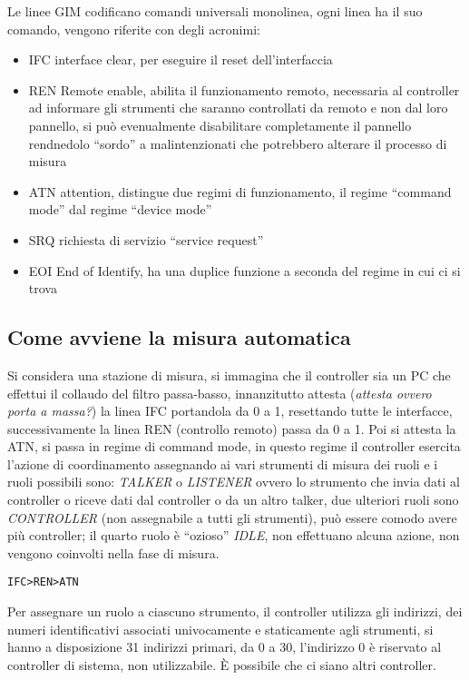 Le linee GIM codificano comandi universali monolinea, ogni linea ha il suo
comando, vengono riferite con degli acronimi:
\begin{itemize}
\item IFC interface clear, per eseguire il reset dell'interfaccia
\item REN Remote enable, abilita il funzionamento remoto, necessaria al
controller ad informare gli strumenti che saranno controllati da remoto e non
dal loro pannello, si può evenualmente disabilitare completamente il pannello
rendnedolo ``sordo'' a malintenzionati che potrebbero alterare il processo di
misura
\item ATN attention, distingue due regimi di funzionamento, il regime ``command
mode'' dal regime ``device mode''
\item SRQ richiesta di servizio ``service request''
\item EOI End of Identify, ha una duplice funzione a seconda del regime in cui
ci si trova
\end{itemize}

\subsection{Come avviene la misura automatica}
Si considera una stazione di misura, si immagina che il controller sia un PC che
effettui il collaudo del filtro passa-basso,
innanzitutto attesta (\textit{attesta ovvero porta a massa?}) la linea IFC
portandola da 0 a 1, resettando tutte le interfacce, successivamente la linea
REN (controllo remoto) passa da 0 a 1. Poi si attesta la ATN, si passa in
regime di command mode,
in questo regime il controller esercita l'azione di coordinamento assegnando ai
vari strumenti di misura dei ruoli e i ruoli possibili sono: \textit{TALKER} o
\textit{LISTENER} ovvero lo strumento che invia dati al controller o riceve
dati dal controller o da un altro talker, due ulteriori ruoli sono
\textit{CONTROLLER} (non assegnabile a tutti gli strumenti), può essere comodo
avere più controller; il quarto ruolo è ``ozioso'' \textit{IDLE}, non
effettuano alcuna azione, non vengono coinvolti nella fase di misura.

\verb|IFC>REN>ATN|

Per assegnare un ruolo a ciascuno strumento, il controller utilizza gli
indirizzi, dei numeri identificativi associati univocamente e staticamente agli
strumenti, si hanno a disposizione 31 indirizzi primari, da 0 a 30, l'indirizzo
0 è riservato al controller di sistema, non utilizzabile. È possibile che ci
siano altri controller.

